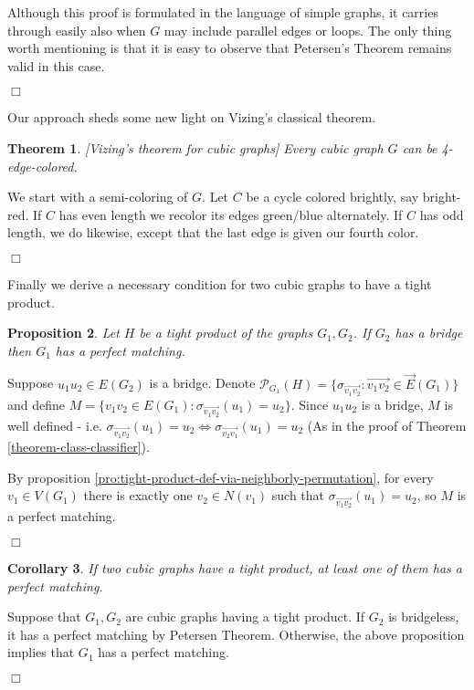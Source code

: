 \documentclass[12pt]{article}
\newtheorem{theorem}{Theorem}[section]
\newtheorem{proposition}[theorem]{Proposition}
\newtheorem{open question}[theorem]{Open question}
\newtheorem{corollary}[theorem]{Corollary}
\newcommand{\proof}{{\par\noindent {\bf Proof}\space\space}}
\newcommand{\proofbox}{\begin{flushright}$\Box$\end{flushright}}
\begin{document}
Although this proof is formulated in the language of simple graphs, it carries through easily also when $G$ may include parallel edges or
loops. The only thing worth mentioning is that it is easy to observe that Petersen's Theorem remains valid in this case.
\proofbox

Our approach sheds some new light on Vizing's classical theorem.

\begin{theorem}\label{theorem:vizing}
[Vizing's theorem for cubic graphs] Every cubic graph $G$ can be 4-edge-colored.
\end{theorem}
\proof 
We start with a semi-coloring of $G$. Let $C$ be a cycle colored brightly, say bright-red. If $C$ has even length we recolor its edges green/blue alternately. If $C$ has odd length, we do likewise, except that the last edge is given our fourth color.
\proofbox
 
Finally we derive a necessary condition for two cubic graphs to have a tight product.
\begin{proposition}
Let $H$ be a tight product of the graphs $G_1,G_2$. If $G_2$ has a bridge then $G_1$ has a perfect matching.
\end{proposition}
\proof
Suppose $u_1u_2\in E(G_2)$ is a bridge. Denote $\mathscr{P}_{G_1}(H)=\{\sigma_{\overrightarrow{v_1v_2}}:\overrightarrow{v_1v_2}\in \vec E(G_1)\}$ and define $M=\{v_1v_2\in E(G_1) :  \sigma_{\overrightarrow{v_1v_2}}(u_1)=u_2\}$. Since $u_1u_2$ is a bridge, $M$ is well defined - i.e. $\sigma_{\overrightarrow{v_1v_2}}(u_1)=u_2\Leftrightarrow \sigma_{\overrightarrow{v_2v_1}}(u_1)=u_2$ (As in the proof of Theorem \ref{theorem-class-classifier}).

By proposition \ref{pro:tight-product-def-via-neighborly-permutation}, for every $v_1\in V(G_1)$ there is exactly one $v_2\in N(v_1)$ such that $\sigma_{\overrightarrow{v_1v_2}}(u_1)=u_2$, so $M$ is a perfect matching.
\proofbox
\begin{corollary}
If two cubic graphs have a tight product, at least one of them has a perfect matching.
\end{corollary}
\proof
Suppose that $G_1,G_2$ are cubic graphs having a tight product. If $G_2$ is bridgeless, it has a perfect matching by Petersen Theorem. Otherwise, the above proposition implies that $G_1$ has a perfect matching.
\proofbox
\end{document}
